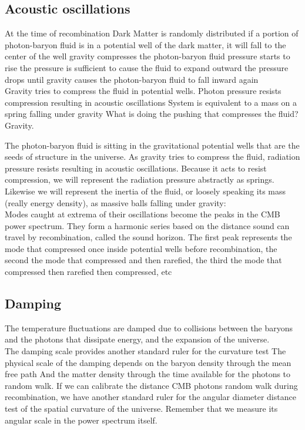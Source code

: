 \documentclass{article}
\begin{document}
\subsection{Acoustic oscillations}
At the time of recombination
Dark Matter is randomly distributed
if a portion of photon-baryon fluid is in a potential well of the dark matter, it will fall to the center of the well
gravity compresses the photon-baryon fluid
pressure starts to rise
the pressure is sufficient to cause the fluid to expand outward
the pressure drops until gravity causes the photon-baryon fluid to fall inward again\\
Gravity tries to compress the fluid in potential wells.
Photon pressure resists compression resulting in acoustic oscillations
System is equivalent to a mass on a spring falling under gravity
What is doing the pushing that compresses the fluid? Gravity.

The photon-baryon fluid is sitting in the gravitational potential wells that are the seeds of structure in the universe.  As gravity tries to compress the fluid, radiation pressure resists resulting in acoustic oscillations.  Because it acts to resist compression, we will represent the radiation pressure abstractly as springs.  Likewise we will represent the inertia of the fluid, or loosely speaking its mass (really energy density), as massive balls falling under gravity:\\

Modes caught at extrema of their oscillations become the peaks in the CMB power spectrum.  They form a harmonic series based on the distance sound can travel by recombination, called the sound horizon.  The first peak represents the mode that compressed once inside potential wells before recombination, the second the mode that compressed and then rarefied, the third the mode that compressed then rarefied then compressed, etc



\subsection{Damping}
The temperature fluctuations are damped due to collisions between the baryons and the photons that dissipate energy, and the expansion of the universe.\\
The damping scale provides another standard ruler for the curvature test
The physical scale of the damping depends on the baryon density through the mean free path
And the matter density through the time available for the photons to random walk.
If we can calibrate the distance CMB photons random walk during recombination, we have another standard ruler for the angular diameter distance test of the spatial curvature of the universe.  Remember that we measure its angular scale in the power spectrum itself.
\end{document}
